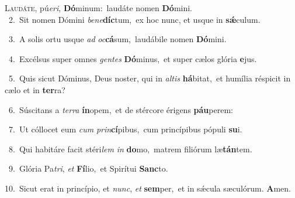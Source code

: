 \lettrine{\initial\textcolor{\initialcolor}{L}}{audáte,} pú\-\textit{e}\-\textit{ri}, \textbf{Dó}\-minum:~\star laudáte nomen \textbf{Dó}\-mini.\\
{\numbfont\textcolor{\numbcolor}{~2.}}~Sit nomen Dómini \textit{be}\-\textit{ne}\textbf{díc}tum,~\star ex hoc nunc, et usque in \textbf{sǽ}\-culum.\par
{\numbfont\textcolor{\numbcolor}{~3.}}~A solis ortu usque \textit{ad} \textit{oc}\-\textbf{cá}sum,~\star laudábile nomen \textbf{Dó}\-mini.\par
{\numbfont\textcolor{\numbcolor}{~4.}}~Excélsus super omnes \textit{gen}\-\textit{tes} \textbf{Dó}\-minus,~\star et super cælos glória \textbf{e}\-jus.\par
{\numbfont\textcolor{\numbcolor}{~5.}}~Quis sicut Dóminus, Deus noster, qui in \textit{al}\-\textit{tis} \textbf{há}\-bitat,~\star et humília réspicit in cælo et in \textbf{ter}\-ra?\par
{\numbfont\textcolor{\numbcolor}{~6.}}~Súscitans a \textit{ter}\-\textit{ra} \textbf{ín}\-opem,~\star et de stércore érigens \textbf{páu}\-perem:\par
{\numbfont\textcolor{\numbcolor}{~7.}}~Ut cóllocet eum \textit{cum} \textit{prin}\-\textbf{cí}pibus,~\star cum princípibus pópuli \textbf{su}\-i.\par
{\numbfont\textcolor{\numbcolor}{~8.}}~Qui habitáre facit stéri\textit{lem} \textit{in} \textbf{do}\-mo,~\star matrem filiórum læ\-\textbf{tán}\-tem.\par
{\numbfont\textcolor{\numbcolor}{~9.}}~Glória Pa\-\textit{tri}\-, \textit{et} \textbf{Fí}\-lio,~\star et Spirítui \textbf{Sanc}\-to.\par
{\numbfont\textcolor{\numbcolor}{10.}}~Sicut erat in princípio, et \textit{nunc}\-, \textit{et} \textbf{sem}\-per,~\star et in sǽcula sæculórum. \textbf{A}\-men.\par
